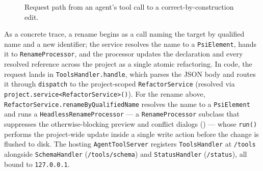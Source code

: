 \begin{figure}[h]
\centering
{}
\caption{Request path from an agent's tool call to a correct-by-construction edit.}
\label{fig:arch}
\end{figure}

As a concrete trace, a rename begins as a call naming the target by qualified name
and a new identifier; the service resolves the name to a \texttt{PsiElement},
hands it to \texttt{RenameProcessor}, and the processor updates the declaration
and every resolved reference across the project as a single atomic refactoring.
In code, the request lands in \texttt{ToolsHandler.handle}, which parses the JSON body
and routes it through \texttt{dispatch} to the project-scoped \texttt{RefactorService}
(resolved via \texttt{project.service<RefactorService>()}). For the rename above,
\texttt{RefactorService.renameByQualifiedName} resolves the name to a
\texttt{PsiElement} and runs a \texttt{HeadlessRenameProcessor} --- a
\texttt{RenameProcessor} subclass that suppresses the otherwise-blocking preview and
conflict dialogs () --- whose \texttt{run()} performs the project-wide
update inside a single write action before the change is flushed to disk. The hosting
\texttt{AgentToolServer} registers \texttt{ToolsHandler} at \texttt{/tools} alongside
\texttt{SchemaHandler} (\texttt{/tools/schema}) and \texttt{StatusHandler}
(\texttt{/status}), all bound to \texttt{127.0.0.1}.

